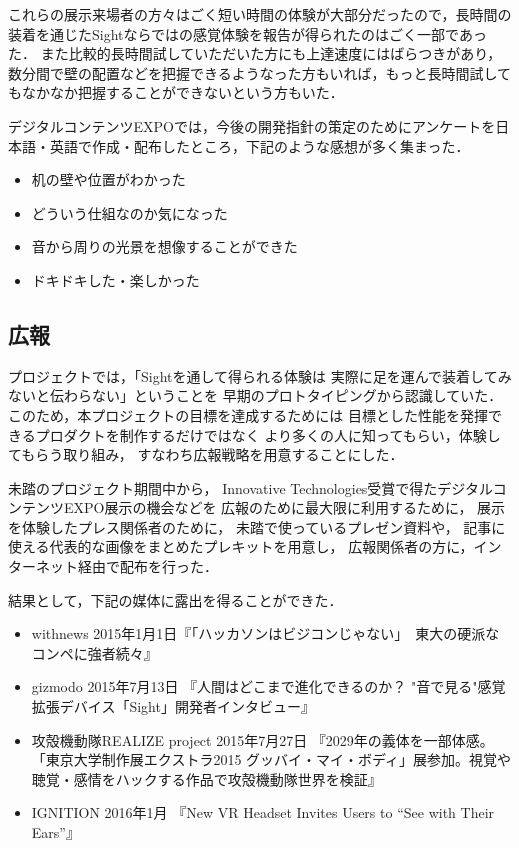 これらの展示来場者の方々はごく短い時間の体験が大部分だったので，長時間の装着を通じたSightならではの感覚体験を報告が得られたのはごく一部であった．
また比較的長時間試していただいた方にも上達速度にはばらつきがあり，
数分間で壁の配置などを把握できるようなった方もいれば，もっと長時間試してもなかなか把握することができないという方もいた．

デジタルコンテンツEXPOでは，今後の開発指針の策定のためにアンケートを日本語・英語で作成・配布したところ，下記のような感想が多く集まった．

\begin{itemize}
 \item 机の壁や位置がわかった
 \item どういう仕組なのか気になった
 \item 音から周りの光景を想像することができた
 \item ドキドキした・楽しかった
\end{itemize}


\subsection{広報}

プロジェクトでは，「Sightを通して得られる体験は
実際に足を運んで装着してみないと伝わらない」ということを
早期のプロトタイピングから認識していた．
このため，本プロジェクトの目標を達成するためには
目標とした性能を発揮できるプロダクトを制作するだけではなく
より多くの人に知ってもらい，体験してもらう取り組み，
すなわち広報戦略を用意することにした．

未踏のプロジェクト期間中から，
Innovative Technologies受賞で得たデジタルコンテンツEXPO展示の機会などを
広報のために最大限に利用するために，
展示を体験したプレス関係者のために，
未踏で使っているプレゼン資料や，
記事に使える代表的な画像をまとめたプレキットを用意し，
広報関係者の方に，インターネット経由で配布を行った．

結果として，下記の媒体に露出を得ることができた．

\begin{itemize}
 \item withnews 2015年1月1日『「ハッカソンはビジコンじゃない」　東大の硬派なコンペに強者続々』
 \item gizmodo 2015年7月13日 『人間はどこまで進化できるのか？ "音で見る"感覚拡張デバイス「Sight」開発者インタビュー』
 \item 攻殻機動隊REALIZE project 2015年7月27日 『2029年の義体を一部体感。「東京大学制作展エクストラ2015 グッバイ・マイ・ボディ」展参加。視覚や聴覚・感情をハックする作品で攻殻機動隊世界を検証』
 \item IGNITION 2016年1月 『New VR Headset Invites Users to “See with Their Ears”』
\end{itemize}


